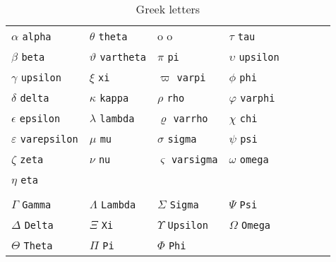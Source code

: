 \documentclass[12pt,a4paper,twoside,openright]{report}
\theoremstyle{definition}
\theoremstyle{itexmp}
\numberwithin{equation}{section}
\begin{document}
	\begin{table}[H]
	\centering
	\begin{tabular}{*8l}
	$\alpha$ \verb?alpha? &$\theta$ \verb?theta? & o o &$\tau$ \verb?tau? \\
	$\beta$ \verb?beta? &$\vartheta$ \verb?vartheta? &$\pi$ \verb?pi?         &$\upsilon$ \verb?upsilon? \\
	$\gamma$ \verb?upsilon? &$\xi$ \verb?xi?  &$\varpi$ \verb?varpi? &$\phi$ \verb?phi?  \\
	$\delta$ \verb?delta? &$\kappa$ \verb?kappa? &$\rho$ \verb?rho? &$\varphi$ \verb?varphi? \\
	$\epsilon$ \verb?epsilon? &$\lambda$ \verb?lambda? &$\varrho$ \verb?varrho? &$\chi$ \verb?chi?  \\
	$\varepsilon$ \verb?varepsilon? &$\mu$ \verb?mu? &$\sigma$ \verb?sigma? &$\psi$ \verb?psi? \\
	$\zeta$ \verb?zeta? &$\nu$ \verb?nu? &$\varsigma$ \verb?varsigma? &$\omega$ \verb?omega? \\
	$\eta$ \verb?eta?\\
    \\
	$\Gamma$ \verb?Gamma? &$\Lambda$ \verb?Lambda? &$\Sigma$ \verb?Sigma? &$\Psi$ \verb?Psi? \\
	$\Delta$ \verb?Delta? &$\Xi$ \verb?Xi? &$\Upsilon$ \verb?Upsilon? &$\Omega$ \verb?Omega?\\
	$\Theta$ \verb?Theta? &$\Pi$ \verb?Pi? &$\Phi$ \verb?Phi?
	\end{tabular}
	\caption{Greek letters}\label{greek}
	\end{table}
\end{document}
